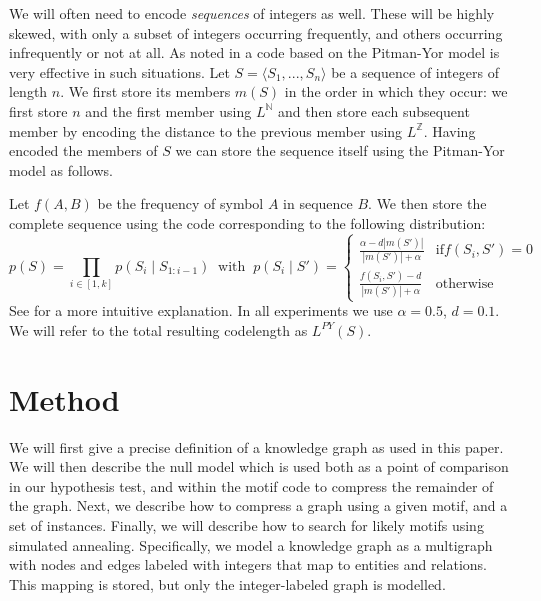 \documentclass[runningheads]{style/llncs}
\newcommand{\N}{{\mathbb N}}
\newcommand{\Z}{{\mathbb Z}}
\begin{document}
We will often need to encode \emph{sequences} of integers as well. These will be highly skewed, with only a subset of integers occurring frequently, and others occurring infrequently or not at all. As noted in \cite{de2016names} a code based on the Pitman-Yor model \cite{pitman1997two} is very effective in such situations. Let $S = \langle S_1, ..., S_n\rangle$ be a sequence of integers of length $n$. We first store its members $m(S)$ in the order in which they occur: we first store $n$ and the first member using $L^\N$ and then store each subsequent member by encoding the distance to the previous member using $L^\Z$. Having encoded the members of $S$ we can store the sequence itself using the Pitman-Yor model as follows.

Let $f(A, B)$ be the frequency of symbol $A$ in sequence $B$. We then store the complete sequence using the code corresponding to the following distribution:
\[
p(S) = \prod_{i \in [1,k]} p(S_i\mid S_{1:i-1})\;\;\text{with}\;\;
p(S_i \mid S') = 
\begin{cases}
\frac{\alpha - d |m(S')|}{|m(S')| + \alpha} & \text{if} f(S_i, S') = 0 \\ 
\frac{f(S_i, S') - d}{|m(S')| + \alpha} & \text{otherwise}
\end{cases}
\]
See \cite{de2016names} for a more intuitive explanation. In all experiments we use $\alpha = 0.5$, $d=0.1$. We will refer to the total resulting codelength as $L^{PY}(S)$.

\section{Method}

We will first give a precise definition of a knowledge graph as used in this paper. We will then describe the null model which is used both as a point of comparison in our hypothesis test, and within the motif code to compress the remainder of the graph. Next, we describe how to compress a graph using a given motif, and a set of instances. Finally, we will describe how to search for likely motifs using simulated annealing.
%
Specifically, we model a knowledge graph as a multigraph with nodes and edges labeled with integers that map to entities and relations. This mapping is stored, but only the integer-labeled graph is modelled.\footnotemark
{}
\end{document}
